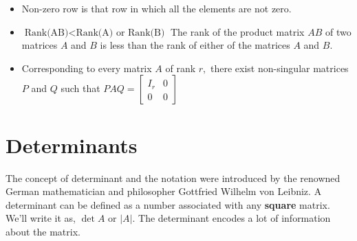  \begin{note}
 	\begin{itemize}
 		\item Non-zero row is that row in which all the elements are not zero.\\
 		\item  $\text{Rank(AB)}< \text{Rank(A) or} \text{ Rank(B)}$
 		The rank of the product matrix $A B$ of two matrices $A$ and $B$ is less than the rank of either of the matrices $A$ and $B$.\\
 		\item  Corresponding to every matrix $A$ of rank $r,$ there exist non-singular matrices $P$ and $Q$ such
 		that $P A Q=\left[\begin{array}{cc}I_{r} & 0 \\ 0 & 0\end{array}\right]$
 	\end{itemize}
 \end{note}
\section{Determinants}
The concept of determinant and the notation were introduced by the renowned German mathematician and philosopher Gottfried Wilhelm von Leibniz. A determinant can be defined as  a number associated with any \textbf{square} matrix. We'll write it as,  $\operatorname{det}A$ or $|A|$. The determinant encodes a lot of information about the matrix. 
